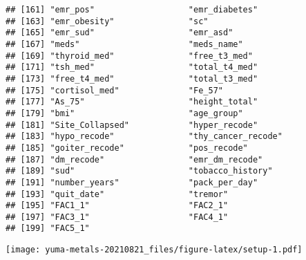 \documentclass[]{article}
\newenvironment{Shaded}{\begin{snugshade}}{\end{snugshade}}
\newcommand{\CommentTok}[1]{\textcolor[rgb]{0.56,0.35,0.01}{\textit{#1}}}
\newcommand{\DecValTok}[1]{\textcolor[rgb]{0.00,0.00,0.81}{#1}}
\newcommand{\KeywordTok}[1]{\textcolor[rgb]{0.13,0.29,0.53}{\textbf{#1}}}
\newcommand{\NormalTok}[1]{#1}
\newcommand{\OperatorTok}[1]{\textcolor[rgb]{0.81,0.36,0.00}{\textbf{#1}}}
\begin{document}
\begin{verbatim}
## [161] "emr_pos"                   "emr_diabetes"             
## [163] "emr_obesity"               "sc"                       
## [165] "emr_sud"                   "emr_asd"                  
## [167] "meds"                      "meds_name"                
## [169] "thyroid_med"               "free_t3_med"              
## [171] "tsh_med"                   "total_t4_med"             
## [173] "free_t4_med"               "total_t3_med"             
## [175] "cortisol_med"              "Fe_57"                    
## [177] "As_75"                     "height_total"             
## [179] "bmi"                       "age_group"                
## [181] "Site_Collapsed"            "hyper_recode"             
## [183] "hypo_recode"               "thy_cancer_recode"        
## [185] "goiter_recode"             "pos_recode"               
## [187] "dm_recode"                 "emr_dm_recode"            
## [189] "sud"                       "tobacco_history"          
## [191] "number_years"              "pack_per_day"             
## [193] "quit_date"                 "tremor"                   
## [195] "FAC1_1"                    "FAC2_1"                   
## [197] "FAC3_1"                    "FAC4_1"                   
## [199] "FAC5_1"
\end{verbatim}

\begin{Shaded}
\end{Shaded}

\texttt{[image: yuma-metals-20210821\_files/figure-latex/setup-1.pdf]}

\begin{Shaded}
\end{Shaded}
\end{document}
